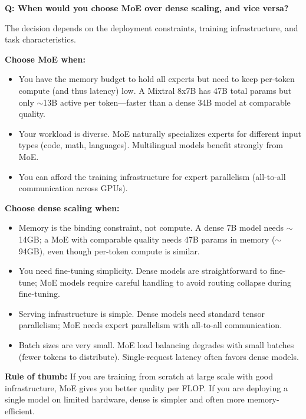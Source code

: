 \begin{interviewq}
\textbf{Q: When would you choose MoE over dense scaling, and vice versa?}

 \quad {} \quad \badgefreq{\freqmed}

\stronganswer

The decision depends on the deployment constraints, training infrastructure, and task characteristics.

\textbf{Choose MoE when:}
\begin{itemize}
    \item You have the memory budget to hold all experts but need to keep per-token compute (and thus latency) low. A Mixtral 8x7B has 47B total params but only $\sim$13B active per token---faster than a dense 34B model at comparable quality.
    \item Your workload is diverse. MoE naturally specializes experts for different input types (code, math, languages). Multilingual models benefit strongly from MoE.
    \item You can afford the training infrastructure for expert parallelism (all-to-all communication across GPUs).
\end{itemize}

\textbf{Choose dense scaling when:}
\begin{itemize}
    \item Memory is the binding constraint, not compute. A dense 7B model needs $\sim$14GB; a MoE with comparable quality needs 47B params in memory ($\sim$94GB), even though per-token compute is similar.
    \item You need fine-tuning simplicity. Dense models are straightforward to fine-tune; MoE models require careful handling to avoid routing collapse during fine-tuning.
    \item Serving infrastructure is simple. Dense models need standard tensor parallelism; MoE needs expert parallelism with all-to-all communication.
    \item Batch sizes are very small. MoE load balancing degrades with small batches (fewer tokens to distribute). Single-request latency often favors dense models.
\end{itemize}

\textbf{Rule of thumb:} If you are training from scratch at large scale with good infrastructure, MoE gives you better quality per FLOP. If you are deploying a single model on limited hardware, dense is simpler and often more memory-efficient.


\end{interviewq}
